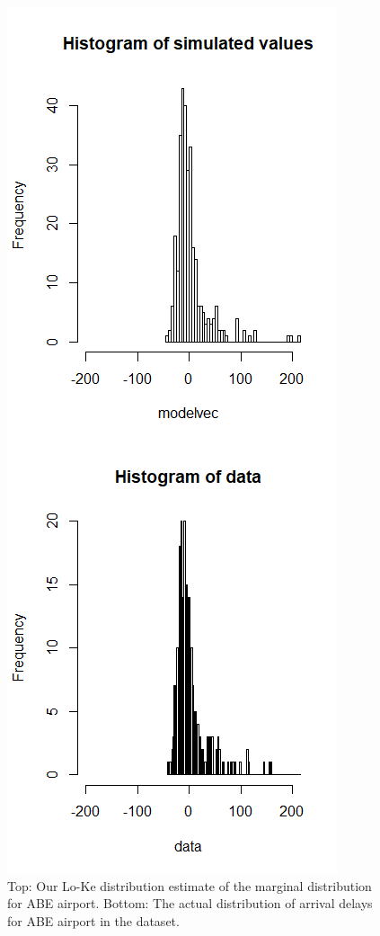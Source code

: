 \documentclass[12pt, a4paper, openany]{book}
\begin{document}
			\begin{figure}[h]
			\centering
	 		\includegraphics[width = .5 \textwidth]{../figures/Originabe}
	 		\caption{Top: Our Lo-Ke distribution estimate of the marginal distribution for ABE airport. Bottom: The actual distribution of arrival delays for ABE airport in the dataset.}
	 		\end{figure}	
\end{document}
